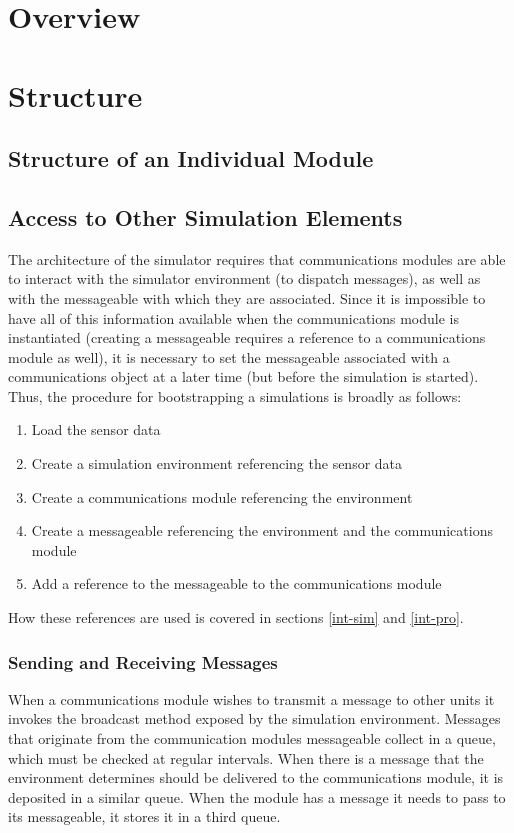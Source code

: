 \section{Overview}

\section{Structure}
	\subsection{Structure of an Individual Module}
		\subsection{Access to Other Simulation Elements}
		
The architecture of the simulator requires that communications modules are able to interact with the simulator environment (to dispatch messages), as well as with the messageable with which they are associated. Since it is impossible to have all of this information available when the communications module is instantiated (creating a messageable requires a reference to a communications module as well), it is necessary to set the messageable associated with a communications object at a later time (but before the simulation is started). Thus, the procedure for bootstrapping a simulations is broadly as follows:

\begin{enumerate}
	\item Load the sensor data
	\item Create a simulation environment referencing the sensor data
	\item Create a communications module referencing the environment
	\item Create a messageable referencing the environment and the communications module
	\item Add a reference to the messageable to the communications module
\end{enumerate}

How these references are used is covered in sections \ref{int-sim} and \ref{int-pro}.

		\subsubsection{Sending and Receiving Messages}
		
When a communications module wishes to transmit a message to other units it invokes the broadcast method exposed by the simulation environment. Messages that originate from the communication modules messageable collect in a queue, which must be checked at regular intervals. When there is a message that the environment determines should be delivered to the communications module, it is deposited in a similar queue. When the module has a message it needs to pass to its messageable, it stores it in a third queue.

